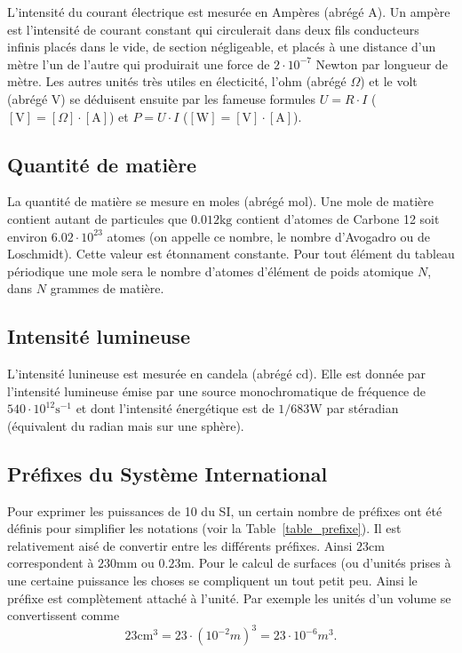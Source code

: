 \documentclass[a4paper,12pt]{book}
\newcommand{\cm}{\mathrm{cm}}
\newcommand{\mm}{\mathrm{mm}}
\newcommand{\cd}{\mathrm{cd}}
\newcommand{\mol}{\mathrm{mol}}
\newcommand{\m}{\mathrm{m}}
\newcommand{\s}{\mathrm{s}}
\newcommand{\kg}{\mathrm{kg}}
\newcommand{\A}{\mathrm{A}}
\newcommand{\V}{\mathrm{V}}
\newcommand{\W}{\mathrm{W}}
\begin{document}
L'intensité du courant électrique est mesurée en Ampères (abrégé $\A$). Un ampère est l'intensité de courant constant qui circulerait 
dans deux fils conducteurs infinis placés dans le vide, de section négligeable, et placés à une distance d'un mètre l'un de l'autre 
qui produirait une force de $2\cdot 10^{-7}$ Newton par longueur de mètre. Les autres unités très utiles en électicité, l'ohm (abrégé $\Omega$) et 
le volt (abrégé $\V$) se déduisent ensuite par les fameuse formules $U=R\cdot I$ ($[\V]=[\Omega]\cdot [\A]$) et $P=U\cdot I$ ($[\W]=[\V]\cdot [\A]$).

\subsection{Quantité de matière}

La quantité de matière se mesure en moles (abrégé $\mol$). Une mole de matière contient autant de particules que 
$0.012\kg$ contient d'atomes de Carbone 12 soit environ $6.02\cdot 10^{23}$ atomes (on appelle ce nombre, le nombre d'Avogadro ou de Loschmidt). 
Cette valeur est étonnament constante. Pour
tout élément du tableau périodique une mole sera le nombre d'atomes d'élément de poids atomique $N$, dans $N$ grammes de matière.

\subsection{Intensité lumineuse}

L'intensité lunineuse est mesurée en candela (abrégé $\cd$). Elle est donnée par l'intensité lumineuse émise par
une source monochromatique de fréquence de $540\cdot 10^{12}\s^{-1}$ et dont l'intensité énergétique est de 
$1/683 \W$ par stéradian (équivalent du radian mais sur une sphère).

\subsection{Préfixes du Système International}

Pour exprimer les puissances de 10 du SI, un certain nombre de préfixes ont été définis pour simplifier 
les notations (voir la Table~\ref{table_prefixe}). Il est relativement aisé de convertir entre les différents préfixes.
Ainsi $23\cm$ correspondent à $230\mm$ ou $0.23\m$. Pour le calcul de surfaces (ou d'unités prises à une certaine puissance les choses
se compliquent un tout petit peu. Ainsi le préfixe est complètement attaché à l'unité. Par exemple les unités d'un volume
se convertissent comme
\begin{equation}
 23\cm^3=23\cdot(10^{-2} m)^3=23\cdot 10^{-6}m^3.
\end{equation}
\end{document}
